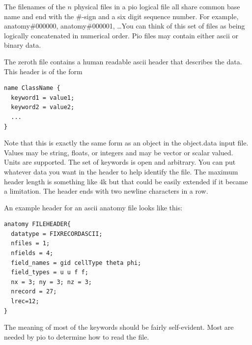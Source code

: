 \documentclass{article}
\begin{document}
The filenames of the $n$ physical files in a pio logical file all share
common base name and end with the \#-sign and a six digit sequence
number.  For example, anatomy\#000000, anatomy\#000001, \ldots You can
think of this set of files as being logically concatenated in numerical
order.  Pio files may contain either ascii or binary data.

The zeroth file contains a human readable ascii header that describes
the data.  This header is of the form
\begin{verbatim}
name ClassName { 
  keyword1 = value1; 
  keyword2 = value2;
  ...
}
\end{verbatim}
Note that this is exactly the same form as an object in the object.data
input file.  Values may be string, floats, or integers and may be vector
or scalar valued.  Units are supported.  The set of keywords is open and
arbitrary.  You can put whatever data you want in the header to help
identify the file.  The maximum header length is something like 4k but
that could be easily extended if it became a limitation.  The header
ends with two newline characters in a row.

An example header for an ascii anatomy file looks like this:
\begin{verbatim}
anatomy FILEHEADER{
  datatype = FIXRECORDASCII;
  nfiles = 1;
  nfields = 4;
  field_names = gid cellType theta phi;
  field_types = u u f f;
  nx = 3; ny = 3; nz = 3;
  nrecord = 27;
  lrec=12;
}
\end{verbatim}
The meaning of most of the keywords should be fairly self-evident.
  Most are needed by pio to determine
how to read the file.  
\end{document}
